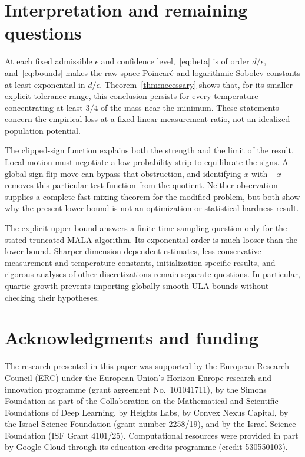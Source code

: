 \documentclass[11pt,letterpaper]{article}
\numberwithin{equation}{section}
\theoremstyle{remark}
\newcommand{\1}{\mathbf 1}
\begin{document}
\section{Interpretation and remaining questions}

At each fixed admissible $\epsilon$ and confidence level,~\eqref{eq:beta} is of order $d/\epsilon$, and~\eqref{eq:bounds} makes the raw-space Poincar\'e and logarithmic Sobolev constants at least exponential in $d/\epsilon$. Theorem~\ref{thm:necessary} shows that, for its smaller explicit tolerance range, this conclusion persists for every temperature concentrating at least $3/4$ of the mass near the minimum. These statements concern the empirical loss at a fixed linear measurement ratio, not an idealized population potential.

The clipped-sign function explains both the strength and the limit of the result. Local motion must negotiate a low-probability strip to equilibrate the signs. A global sign-flip move can bypass that obstruction, and identifying $x$ with $-x$ removes this particular test function from the quotient. Neither observation supplies a complete fast-mixing theorem for the modified problem, but both show why the present lower bound is not an optimization or statistical hardness result.

The explicit upper bound answers a finite-time sampling question only for the stated truncated MALA algorithm. Its exponential order is much looser than the lower bound. Sharper dimension-dependent estimates, less conservative measurement and temperature constants, initialization-specific results, and rigorous analyses of other discretizations remain separate questions. In particular, quartic growth prevents importing globally smooth ULA bounds without checking their hypotheses.

\section*{Acknowledgments and funding}

The research presented in this paper was supported by the European Research Council (ERC) under the European Union's Horizon Europe research and innovation programme (grant agreement No.~101041711), by the Simons Foundation as part of the Collaboration on the Mathematical and Scientific Foundations of Deep Learning, by Heights Labs, by Convex Nexus Capital, by the Israel Science Foundation (grant number 2258/19), and by the Israel Science Foundation (ISF Grant 4101/25). Computational resources were provided in part by Google Cloud through its education credits programme (credit 530550103).
\end{document}

